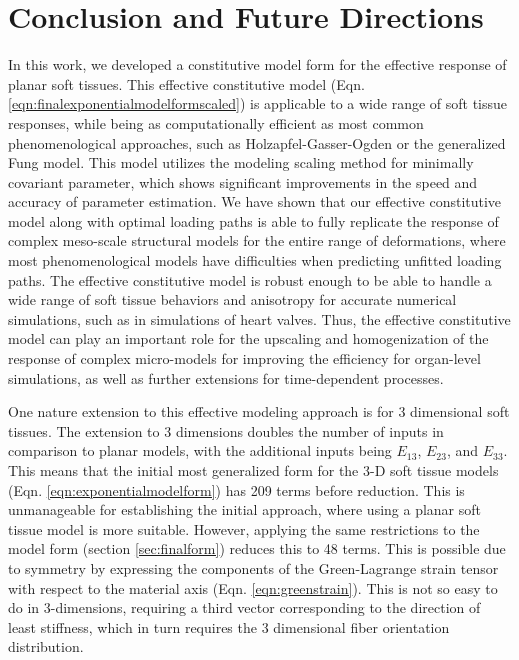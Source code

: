 \section{Conclusion and Future Directions} 

	In this work, we developed a constitutive model form for the effective response of planar soft tissues. This effective constitutive model (Eqn. \ref{eqn:finalexponentialmodelformscaled}) is applicable to a wide range of soft tissue responses, while being as computationally efficient as most common phenomenological approaches, such as Holzapfel-Gasser-Ogden or the generalized Fung model. This model utilizes the modeling scaling method for minimally covariant parameter, which shows significant improvements in the speed and accuracy of parameter estimation. We have shown that our effective constitutive model along with optimal loading paths is able to fully replicate the response of complex meso-scale structural models for the entire range of deformations, where most phenomenological models have difficulties when predicting unfitted loading paths. The effective constitutive model is robust enough to be able to handle a wide range of soft tissue behaviors and anisotropy for accurate numerical simulations, such as in simulations of heart valves. Thus, the effective constitutive model can play an important role for the upscaling and homogenization of the response of complex micro-models for improving the efficiency for organ-level simulations, as well as further extensions for time-dependent processes. 
    

	One nature extension to this effective modeling approach is for 3 dimensional soft tissues. The extension to 3 dimensions doubles the number of inputs in comparison to planar models, with the additional inputs being $E_{13}$, $E_{23}$, and $E_{33}$. This means that the initial most generalized form for the 3-D soft tissue models (Eqn. \ref{eqn:exponentialmodelform}) has 209 terms before reduction. This is unmanageable for establishing the initial approach, where using a planar soft tissue model is more suitable. However, applying the same restrictions to the model form (section \ref{sec:finalform}) reduces this to 48 terms. This is possible due to symmetry by expressing the components of the Green-Lagrange strain tensor with respect to the material axis (Eqn. \ref{eqn:greenstrain}). This is not so easy to do in 3-dimensions, requiring a third vector corresponding to the direction of least stiffness, which in turn requires the 3 dimensional fiber orientation distribution. 
    
    
    
    
    
    
    
    
